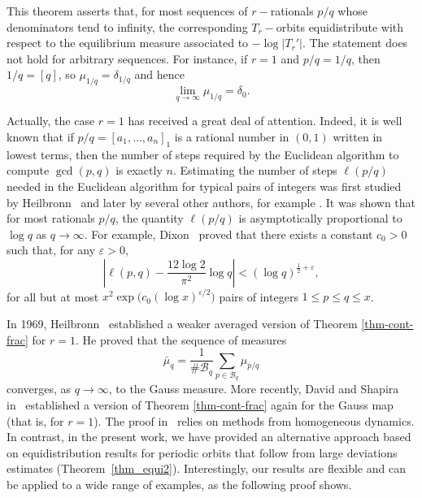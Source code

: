\documentclass[letterpaper,11pt]{amsart}
\numberwithin{equation}{section}     %
\def\B{{\mathcal B}}
\def\le{\leqslant}
\begin{document}
This theorem asserts that, for most sequences of $r-$rationals $p/q$ whose denominators tend to infinity, the corresponding $T_r-$orbits equidistribute with respect to the equilibrium measure associated to $-\log|T_r'|$. The statement does not hold for arbitrary sequences. For instance, if $r=1$ and $p/q = 1/q$, then $1/q = [q]$, so $\mu_{1/q} = \delta_{1/q}$ and hence
\[
\lim_{q \to \infty} \mu_{1/q} = \delta_0.
\]

Actually, the case $r=1$ has received a great deal of attention. Indeed, it is well known that if $p/q = [a_1,\dots,a_n]_1$ is a rational number in $(0,1)$ written in lowest terms, then the number of steps required by the Euclidean algorithm to compute $\gcd(p,q)$ is exactly $n$. Estimating the number of steps $\ell(p/q)$ needed in the Euclidean algorithm for typical pairs of integers was first studied by Heilbronn~\cite{he} and later by several other authors, for example \cite{bv, by, h, po}. It was shown that for most rationals $p/q$, the quantity $\ell(p/q)$ is asymptotically proportional to $\log q$ as $q \to \infty$. For example, Dixon~\cite{di} proved that there exists a constant $c_0>0$ such that, for any $\varepsilon>0$,
\[
\left| \ell(p,q) - \frac{12 \log 2}{\pi^2} \log q \right|
<
 (\log q)^{ \frac{1}{2}+ \varepsilon },
\]
for all but at most $x^2 \exp\!\big(c_0 (\log x)^{\varepsilon/2}\big)$ pairs of integers $1 \le p \le q \le x$. 

In 1969, Heilbronn~\cite{he} established a weaker averaged version of Theorem \ref{thm-cont-frac} for $r=1$. He proved that the sequence of measures
\[
\bar{\mu}_q
=
\frac{1}{\#\B_q}
\sum_{p \in \B_q} \mu_{p/q}
\]
converges, as $q \to \infty$, to the Gauss measure. More recently,  David and Shapira in~\cite[Theorem~1.1(2)]{ds} established a version of Theorem \ref{thm-cont-frac} again for the Gauss map (that is,  for $r=1$). The proof  in~\cite{ds} relies on methods from homogeneous dynamics. In contrast, in the present work, we have provided an alternative approach based on equidistribution results for periodic orbits that follow from large deviations estimates (Theorem~\ref{thm_equi2}). Interestingly, our results are flexible and can be applied to a wide range of examples, as the following proof shows.  
\end{document}
